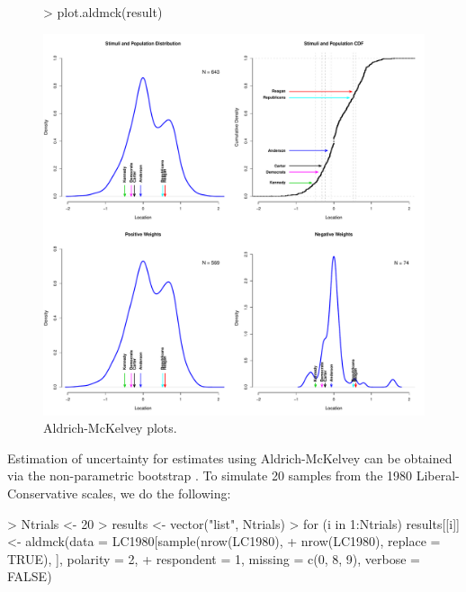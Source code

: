 \documentclass[nojss]{jss}
\begin{document}
\begin{figure}
\begin{center}
\begin{Schunk}
\begin{Sinput}
> plot.aldmck(result)
\end{Sinput}
\end{Schunk}
\includegraphics{basicspace-aldmck_plot}
\end{center}
\caption{Aldrich-McKelvey plots.}
\label{fig:aldmck_plot}
\end{figure}



Estimation of uncertainty for estimates using Aldrich-McKelvey can be obtained via the non-parametric bootstrap \citep{efron1993introduction}. To simulate 20 samples from the 1980 Liberal-Conservative scales, we do the following:

\begin{Schunk}
\begin{Sinput}
> Ntrials <- 20
> results <- vector("list", Ntrials)
> for (i in 1:Ntrials) results[[i]] <- aldmck(data = LC1980[sample(nrow(LC1980), 
+     nrow(LC1980), replace = TRUE), ], polarity = 2, 
+     respondent = 1, missing = c(0, 8, 9), verbose = FALSE)
\end{Sinput}
\end{Schunk}
\end{document}

